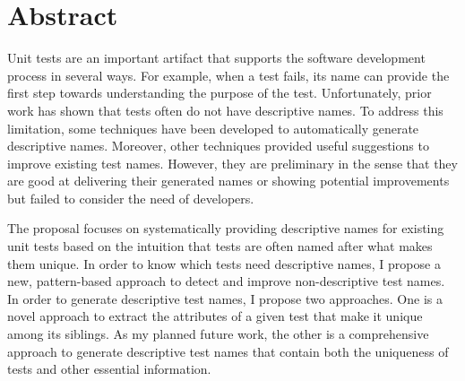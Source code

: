 \section*{Abstract}
\label{sec:abstract}

Unit tests are an important artifact that supports the software development process in several ways.
%
For example, when a test fails, its name can provide the first step towards understanding the purpose of the test.
%
Unfortunately, prior work has shown that tests often do not have descriptive names. 
%
To address this limitation, some techniques have been developed to automatically generate descriptive names.
%
Moreover, other techniques provided useful suggestions to improve existing test names.
%
However, they are preliminary in the sense that they are good at delivering their generated names or showing potential improvements but failed to consider the need of developers.


The proposal focuses on systematically providing descriptive names for existing unit tests based on the intuition that tests are often named after what makes them unique.
%
In order to know which tests need descriptive names, I propose a new, pattern-based approach to detect and improve non-descriptive test names.
%
In order to generate descriptive test names, I propose two approaches.
%
One is a novel approach to extract the attributes of a given test that make it unique among its siblings.
%
As my planned future work, the other is a comprehensive approach to generate descriptive test names that contain both the uniqueness of tests and other essential information. 
